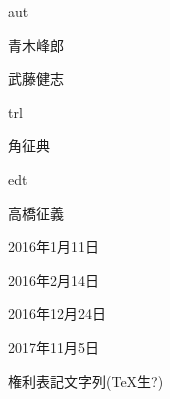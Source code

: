 
\begin{rdnames}{aut}%
\item 青木峰郎
\item 武藤健志
\end{rdnames}

\begin{rdnames}{trl}%
\item 角征典
\end{rdnames}

\begin{rdnames}{edt}%
\item 高橋征義
\end{rdnames}



\begin{rdhistory}
\begin{rdedition}
\item 2016年1月11日 %
\item 2016年2月14日 %
\end{rdedition}
\begin{rdedition}
\item 2016年12月24日 %
\item 2017年11月5日 %
\end{rdedition}
\end{rdhistory}
\begin{rdrights}
権利表記文字列(TeX生?)
\end{rdrights}


